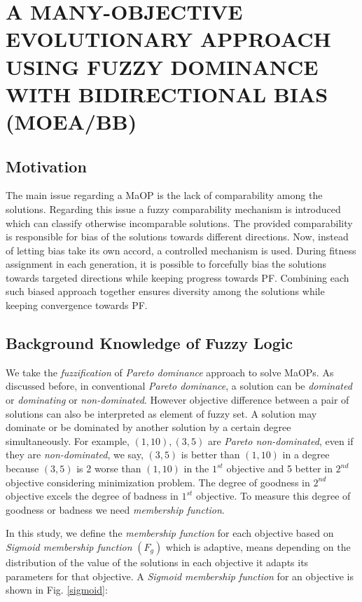 \documentclass[journal]{IEEEtran}
\begin{document}
\section{A MANY-OBJECTIVE EVOLUTIONARY APPROACH USING FUZZY DOMINANCE WITH BIDIRECTIONAL BIAS (MOEA/BB)}
\label{sec:ourapproach}

\subsection{Motivation}
The main issue regarding a MaOP is the lack of comparability among the solutions. Regarding this issue a fuzzy comparability mechanism is introduced which can classify otherwise incomparable solutions. The provided comparability is responsible for bias of the solutions towards different directions. Now, instead of letting bias take its own accord, a controlled mechanism is used. During fitness assignment in each generation, it is possible to forcefully bias the solutions towards targeted directions while keeping progress towards PF. Combining each such biased approach together ensures diversity among the solutions while keeping convergence towards PF.


\subsection{Background Knowledge of Fuzzy Logic}

We take the \textit{fuzzification} of \textit{Pareto dominance} approach to solve MaOPs. As discussed before, in conventional \textit{Pareto dominance}, a solution can be \textit{dominated} or \textit{dominating} or \textit{non-dominated}. However objective difference between a pair of solutions can also be interpreted as element of fuzzy set. A solution may dominate or be dominated by another solution by a certain degree simultaneously. For example, $(1,10),(3,5)$ are \textit{Pareto non-dominated}, even if they are \textit{non-dominated}, we say, $(3,5)$ is better than $(1,10)$ in a degree because $(3,5)$ is 2 worse than $(1,10)$ in the $1^{st}$ objective and 5 better in $2^{nd}$ objective considering minimization problem. The degree of goodness in $2^{nd}$ objective excels the degree of badness in $1^{st}$ objective. To measure this degree of goodness or badness we need \textit{membership function}.

In this study, we define the \textit{membership function} for each objective based on \textit{Sigmoid membership function} $(F_g)$ which is adaptive, means depending on the distribution of the value of the solutions in each objective it adapts its parameters for that objective. A \textit{Sigmoid membership function} for an objective is shown in Fig. \ref{sigmoid}:
\end{document}
